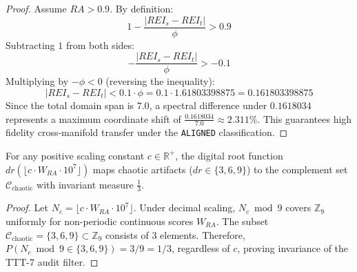 \begin{proof}
Assume $RA > 0.9$. By definition:
\begin{equation}
    1 - \frac{|REI_s - REI_t|}{\phi} > 0.9
\end{equation}
Subtracting $1$ from both sides:
\begin{equation}
    -\frac{|REI_s - REI_t|}{\phi} > -0.1
\end{equation}
Multiplying by $-\phi < 0$ (reversing the inequality):
\begin{equation}
    |REI_s - REI_t| < 0.1 \cdot \phi = 0.1 \cdot 1.61803398875 = 0.161803398875
\end{equation}
Since the total domain span is $7.0$, a spectral difference under $0.1618034$ represents a maximum coordinate shift of $\frac{0.1618034}{7.0} \approx 2.311\%$. This guarantees high fidelity cross-manifold transfer under the \texttt{ALIGNED} classification.
\end{proof}

\begin{lemma}
For any positive scaling constant $c \in \mathbb{R}^+$, the digital root function $dr(\lfloor c \cdot W_{RA} \cdot 10^7 \rfloor)$ maps chaotic artifacts ($dr \in \{3, 6, 9\}$) to the complement set $\mathcal{C}_{\text{chaotic}}$ with invariant measure $\frac{1}{3}$.
\end{lemma}

\begin{proof}
Let $N_c = \lfloor c \cdot W_{RA} \cdot 10^7 \rfloor$. Under decimal scaling, $N_c \bmod 9$ covers $\mathbb{Z}_9$ uniformly for non-periodic continuous scores $W_{RA}$. The subset $\mathcal{C}_{\text{chaotic}} = \{3, 6, 9\} \subset \mathbb{Z}_9$ consists of 3 elements. Therefore, $P(N_c \bmod 9 \in \{3, 6, 9\}) = 3/9 = 1/3$, regardless of $c$, proving invariance of the TTT-7 audit filter.
\end{proof}
